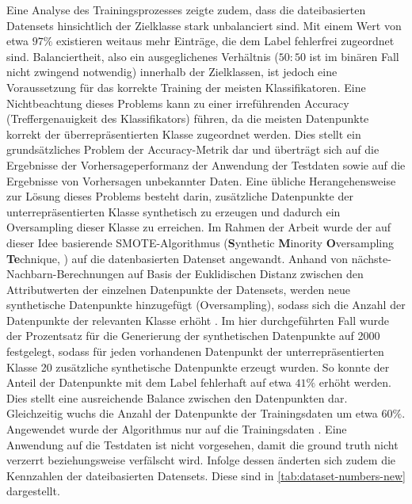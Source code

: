 \label{smote}
Eine Analyse des Trainingsprozesses zeigte zudem, dass die dateibasierten Datensets hinsichtlich der Zielklasse stark unbalanciert sind. Mit einem Wert von etwa $97\%$ existieren weitaus mehr Einträge, die dem Label \glqq fehlerfrei\grqq{} zugeordnet sind. Balanciertheit, also ein ausgeglichenes Verhältnis ($50:50$ ist im binären Fall nicht zwingend notwendig) innerhalb der Zielklassen, ist jedoch eine Voraussetzung für das korrekte Training der meisten Klassifikatoren. Eine Nichtbeachtung dieses Problems kann zu einer irreführenden Accuracy (Treffergenauigkeit des Klassifikators) führen, da die meisten Datenpunkte korrekt der überrepräsentierten Klasse zugeordnet werden. Dies stellt ein grundsätzliches Problem der Accuracy-Metrik dar und überträgt sich auf die Ergebnisse der Vorhersageperformanz der Anwendung der Testdaten sowie auf die Ergebnisse von Vorhersagen unbekannter Daten. Eine übliche Herangehensweise zur Lösung dieses Problems besteht darin, zusätzliche Datenpunkte der unterrepräsentierten Klasse synthetisch zu erzeugen und dadurch ein Oversampling dieser Klasse zu erreichen. Im Rahmen der Arbeit wurde der auf dieser Idee basierende SMOTE-Algorithmus (\textbf{S}ynthetic \textbf{M}inority \textbf{O}versampling \textbf{Te}chnique, \cite{Chawla2002}) auf die datenbasierten Datenset angewandt. Anhand von nächste-Nachbarn-Berechnungen auf Basis der Euklidischen Distanz zwischen den Attributwerten der einzelnen Datenpunkte der Datensets, werden neue synthetische Datenpunkte hinzugefügt (Oversampling), sodass sich die Anzahl der Datenpunkte der relevanten Klasse erhöht \cite{Chawla2002}. Im hier durchgeführten Fall wurde der Prozentsatz für die Generierung der synthetischen Datenpunkte auf 2000 festgelegt, sodass für jeden vorhandenen Datenpunkt der unterrepräsentierten Klasse 20 zusätzliche synthetische Datenpunkte erzeugt wurden. So konnte der Anteil der Datenpunkte mit dem Label \glqq fehlerhaft\grqq{} auf etwa $41\%$ erhöht werden. Dies stellt eine ausreichende Balance zwischen den Datenpunkten dar. Gleichzeitig wuchs die Anzahl der Datenpunkte der Trainingsdaten um etwa $60\%$. Angewendet wurde der Algorithmus nur auf die Trainingsdaten \cite{Chawla2002}. Eine Anwendung auf die Testdaten ist nicht vorgesehen, damit die \glqq ground truth\grqq{} nicht verzerrt beziehungsweise verfälscht wird. Infolge dessen änderten sich zudem die Kennzahlen der dateibasierten Datensets. Diese sind in \autoref{tab:dataset-numbers-new} dargestellt.

